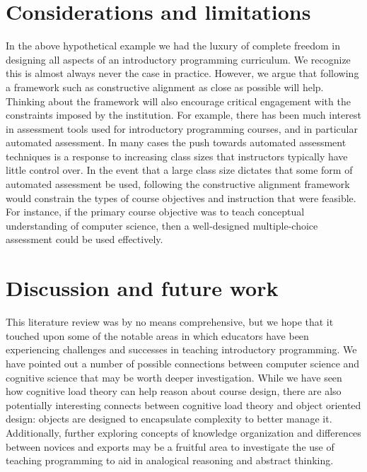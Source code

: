 \documentclass[12pt]{article}
\begin{document}
\section{Considerations and limitations}
In the above hypothetical example we had the luxury of complete
freedom in designing all aspects of an introductory programming
curriculum. We recognize this is almost always never the case in
practice. However, we argue that following a framework such as
constructive alignment as close as possible will help. Thinking about
the framework will also encourage critical engagement with the
constraints imposed by the institution. For example, there has been
much interest in assessment tools used for introductory programming
courses\autocite{lister_blooming_2000,lister_objectives_2001,sheard_exploring_2011},
and in particular automated
assessment\autocite{cheang_automated_2003,traynor_synthesis_2005,ihantola_review_2010}. In
many cases the push towards automated assessment techniques is a
response to increasing class sizes that instructors typically have
little control over. In the event that a large class size dictates
that some form of automated assessment be used, following the
constructive alignment framework would constrain the types of course
objectives and instruction that were feasible. For instance, if the
primary course objective was to teach conceptual understanding of
computer science, then a well-designed multiple-choice assessment
could be used
effectively\autocite{lister_blooming_2000,lister_objectives_2001}.

\section{Discussion and future work}

This literature review was by no means comprehensive, but we hope that
it touched upon some of the notable areas in which educators have been
experiencing challenges and successes in teaching introductory
programming. We have pointed out a number of possible connections
between computer science and cognitive science that may be worth
deeper investigation. While we have seen how cognitive load theory can
help reason about course design, there are also potentially
interesting connects between cognitive load theory and object oriented
design: objects are designed to encapsulate complexity to better
manage it. Additionally, further exploring concepts of knowledge
organization and differences between novices and exports may be a
fruitful area to investigate the use of teaching programming to aid in
analogical reasoning and abstract
thinking\autocite{bennedssen_abstraction_2008}.
\end{document}
